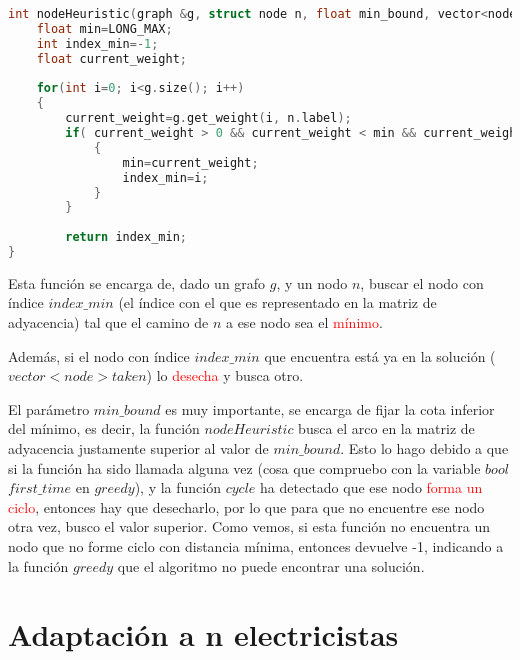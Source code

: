 \documentclass[11pt]{article}
\begin{document}
\begin{lstlisting}[language=C++, caption=Función de selección]
int nodeHeuristic(graph &g, struct node n, float min_bound, vector<node> taken){
	float min=LONG_MAX;
	int index_min=-1;
	float current_weight;
	
	for(int i=0; i<g.size(); i++)
	{
		current_weight=g.get_weight(i, n.label);
		if( current_weight > 0 && current_weight < min && current_weight > min_bound && !is_in(i, taken) )
			{
				min=current_weight;
				index_min=i;
			}        
		}
	
		return index_min;
}
\end{lstlisting}

Esta función se encarga de, dado un grafo $g$, y un nodo $n$, buscar el nodo con índice $index\_min$ (el índice con el que es representado en la matriz de adyacencia) tal que el camino de $n$ a ese nodo sea el \textcolor{red}{mínimo}.

Además, si el nodo con índice $index\_min$ que encuentra está ya en la solución ($vector<node> taken$) lo \textcolor{red}{desecha} y busca otro.

El parámetro $min\_bound$ es muy importante, se encarga de fijar la cota inferior del mínimo, es decir, la función $nodeHeuristic$ busca el arco en la matriz de adyacencia justamente superior al valor de $min\_bound$. Esto lo hago debido a que si la función ha sido llamada alguna vez (cosa que compruebo con la variable $bool$ $first\_time$ en $greedy$), y la función $cycle$ ha detectado que ese nodo \textcolor{red}{forma un ciclo}, entonces hay que desecharlo, por lo que para que no encuentre ese nodo otra vez, busco el valor superior.
Como vemos, si esta función no encuentra un nodo que no forme ciclo con distancia mínima, entonces devuelve -1, indicando a la función $greedy$ que el algoritmo no puede encontrar una solución.


\section{Adaptación a n electricistas}
\end{document}
